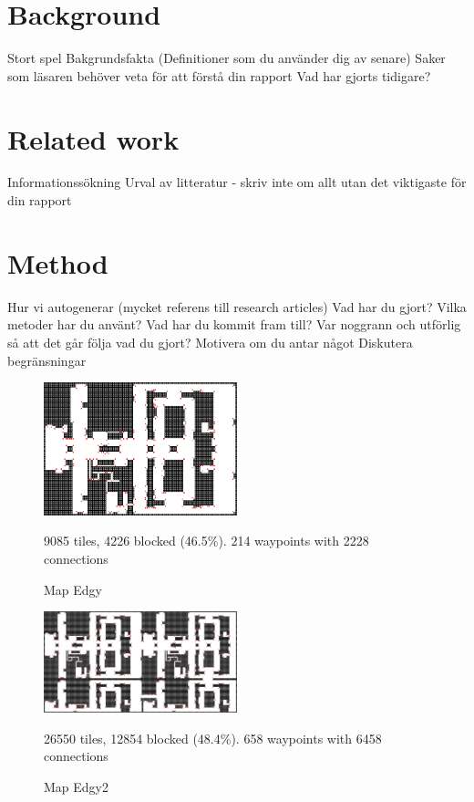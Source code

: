 \documentclass[a4paper]{article}
\begin{document}
\section{Background}
Stort spel \newline
Bakgrundsfakta (Definitioner som du använder dig av senare) \newline
Saker som läsaren behöver veta för att förstå din rapport \newline
Vad har gjorts tidigare?

\section{Related work}
Informationssökning \newline
Urval av litteratur - skriv inte om allt utan det viktigaste för din rapport

\section{Method}
Hur vi autogenerar (mycket referens till research articles) \newline
Vad har du gjort? \newline
Vilka metoder har du använt? \newline
Vad har du kommit fram till? \newline
Var noggrann och utförlig så att det går följa vad du gjort? \newline
Motivera om du antar något \newline
Diskutera begränsningar

\makeatletter
\setlength{\@fptop}{0pt}
\makeatother

\begin{figure}[t!]
\centering
\includegraphics[width=0.5\textwidth,height=\textheight,keepaspectratio]{Data/Edgy.png}
\caption{Map Edgy}
9085 tiles, 4226 blocked (46.5\%). 214 waypoints with 2228 connections
\label{fig:Edgy}
\end{figure}

\begin{figure}[t!]
\centering
\includegraphics[width=0.5\textwidth,height=\textheight,keepaspectratio]{Data/Edgy2.png}
\caption{Map Edgy2}
26550 tiles, 12854 blocked (48.4\%). 658 waypoints with 6458 connections
\label{fig:Edgy2}
\end{figure}
\end{document}
